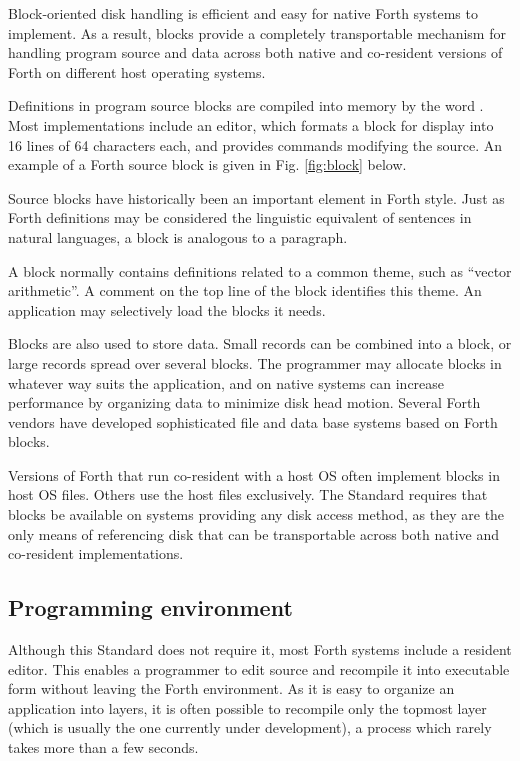 Block-oriented disk handling is efficient and easy for native Forth
systems to implement. As a result, blocks provide a completely
transportable mechanism for handling program source and data across
both native and co-resident versions of Forth on different host
operating systems.

Definitions in program source blocks are compiled into memory by the
word . Most implementations include an editor,
which formats a block for display into 16 lines of 64 characters
each, and provides commands modifying the source. An example of a
Forth source block is given in Fig. \ref{fig:block} below.

Source blocks have historically been an important element in Forth
style. Just as Forth definitions may be considered the linguistic
equivalent of sentences in natural languages, a block is analogous
to a paragraph.

A block normally contains definitions related to a common theme,
such as ``vector arithmetic''. A comment on the top line of the
block identifies this theme. An application may selectively load the
blocks it needs.

Blocks are also used to store data. Small records can be combined
into a block, or large records spread over several blocks. The
programmer may allocate blocks in whatever way suits the application,
and on native systems can increase performance by organizing data to
minimize disk head motion. Several Forth vendors have developed
sophisticated file and data base systems based on Forth blocks.

Versions of Forth that run co-resident with a host OS often implement
blocks in host OS files. Others use the host files exclusively. The
Standard requires that blocks be available on systems providing any
disk access method, as they are the only means of referencing disk
that can be transportable across both native and co-resident
implementations.

\subsection{Programming environment} %

Although this Standard does not require it, most Forth systems
include a resident editor. This enables a programmer to edit source
and recompile it into executable form without leaving the Forth
environment. As it is easy to organize an application into layers,
it is often possible to recompile only the topmost layer (which is
usually the one currently under development), a process which rarely
takes more than a few seconds.

